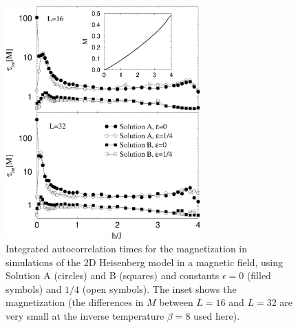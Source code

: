 \documentclass[10pt,pre,aps,twocolumn,showpacs,superscriptaddress,
floatfix]{revtex4}
\begin{document}
\begin{figure}
\includegraphics[clip,width=7.5cm]{fig19.eps}
\caption{Integrated autocorrelation times for the magnetization in
simulations of the 2D Heisenberg model in a magnetic field, using
Solution A (circles) and B (squares) and constants $\epsilon=0$ (filled
symbols) and $1/4$ (open symbols). The inset shows the magnetization
(the differences in $M$ between $L=16$ and $L=32$ are very small at the
inverse temperature $\beta=8$ used here).}
\label{htau2d}
\end{figure}
\end{document}
